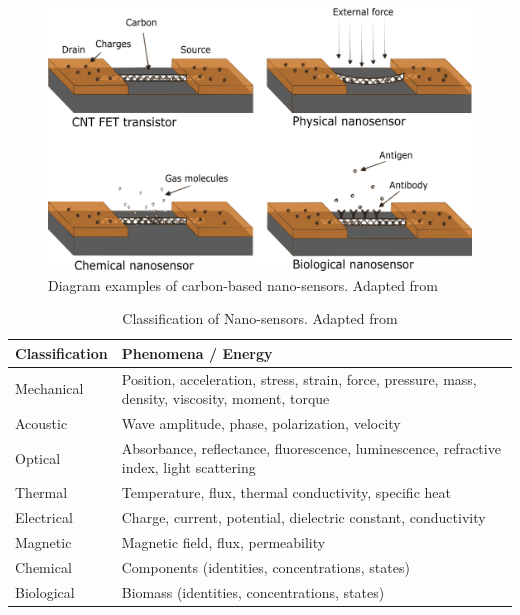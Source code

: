 \begin{figure}[!th]
\centering
\includegraphics[scale=0.50]{./Figures/typesOfNanoSensors.png}
\decoRule
\caption[Types of Nano-sensors]{Diagram examples of carbon-based nano-sensors. Adapted from \cite{BaudritJ2017}}
\label{fig:diameterComparisonOfCarbonFibers}
\end{figure}

\begin{table}[!th]
\centering
\caption[Classification of Nano-sensors]{Classification of Nano-sensors. Adapted from \cite{Khanna2016}}
\begin{tabularx}{\textwidth}{lX}
\hline
\textbf{Classification} & \textbf{Phenomena / Energy} \\
\hline
Mechanical & Position, acceleration, stress, strain, force, pressure, mass, density, viscosity, moment, torque \\
Acoustic & Wave amplitude, phase, polarization, velocity \\
Optical & Absorbance, reflectance, fluorescence, luminescence, refractive index, light scattering \\
Thermal & Temperature, flux, thermal conductivity, specific heat \\
Electrical & Charge, current, potential, dielectric constant, conductivity \\
Magnetic & Magnetic field, flux, permeability \\
Chemical & Components (identities, concentrations, states) \\
Biological & Biomass (identities, concentrations, states) \\
\hline
\end{tabularx}
\label{tab:classificationOfNanosensors}
\end{table}

